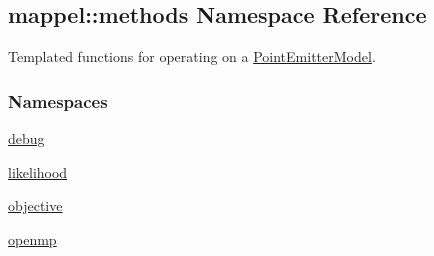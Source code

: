 \hypertarget{namespacemappel_1_1methods}{}\subsection{mappel\+:\+:methods Namespace Reference}
\label{namespacemappel_1_1methods}


Templated functions for operating on a \hyperlink{classmappel_1_1PointEmitterModel}{Point\+Emitter\+Model}.  


\subsubsection*{Namespaces}
\begin{DoxyCompactItemize}
\item 
 \hyperlink{namespacemappel_1_1methods_1_1debug}{debug}
\item 
 \hyperlink{namespacemappel_1_1methods_1_1likelihood}{likelihood}
\item 
 \hyperlink{namespacemappel_1_1methods_1_1objective}{objective}
\item 
 \hyperlink{namespacemappel_1_1methods_1_1openmp}{openmp}
\end{DoxyCompactItemize}
